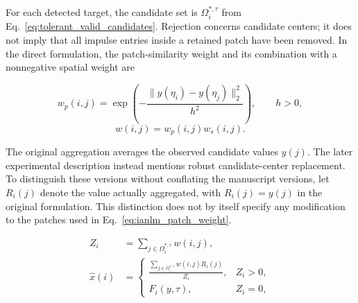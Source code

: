 \documentclass[pdflatex,iicol,sn-mathphys-num]{sn-jnl}
\newif\ifshowportuguese
\newcommand{\pt}[1]{\ifshowportuguese\par\begingroup\small\color{blue!55!black}\noindent\textbf{PT: }#1\par\endgroup\fi}
\begin{document}
For each detected target, the candidate set is $\Omega_i^{*,\tau}$ from Eq.~\eqref{eq:tolerant_valid_candidates}. Rejection concerns candidate centers; it does not imply that all impulse entries inside a retained patch have been removed. In the direct formulation, the patch-similarity weight and its combination with a nonnegative spatial weight are
\pt{Para cada alvo detectado, o conjunto de candidatos é $\Omega_i^{*,\tau}$ da Eq.~\eqref{eq:tolerant_valid_candidates}. A rejeição atua nos centros dos candidatos; ela não implica que todas as posições impulsivas dentro de um patch mantido tenham sido removidas. Na formulação direta, o peso de similaridade entre patches e sua combinação com um peso espacial não negativo são}
\begin{equation}
w_p(i,j)=\exp\left(-\frac{\|y(\eta_i)-y(\eta_j)\|_2^2}{h^2}\right),\qquad h>0,
\label{eq:ianlm_patch_weight}
\end{equation}
\begin{equation}
w(i,j)=w_p(i,j)w_s(i,j).
\label{eq:ianlm_hybrid_weight}
\end{equation}

The original aggregation averages the observed candidate values $y(j)$. The later experimental description instead mentions robust candidate-center replacement. To distinguish these versions without conflating the manuscript versions, let $R_i(j)$ denote the value actually aggregated, with $R_i(j)=y(j)$ in the original formulation. This distinction does not by itself specify any modification to the patches used in Eq.~\eqref{eq:ianlm_patch_weight}.
\pt{A agregação original calcula a média dos valores observados $y(j)$ dos candidatos. A descrição experimental posterior menciona, em vez disso, substituição robusta do centro dos candidatos. Para distinguir essas versões sem presumir uma implementação indisponível, seja $R_i(j)$ o valor efetivamente agregado, com $R_i(j)=y(j)$ na formulação original. Essa distinção não especifica, por si só, qualquer modificação nos patches usados na Eq.~\eqref{eq:ianlm_patch_weight}.}
\begin{equation}
\begin{aligned}
Z_i&=\sum_{j\in\Omega_i^{*,\tau}}w(i,j),\\
\hat{x}(i)&=\begin{cases}
\displaystyle\frac{\sum_{j\in\Omega_i^{*,\tau}}w(i,j)R_i(j)}{Z_i},& Z_i>0,\\
F_i(y,\tau),& Z_i=0,
\end{cases}
\end{aligned}
\label{eq:ianlm_estimate}
\end{equation}
\end{document}
